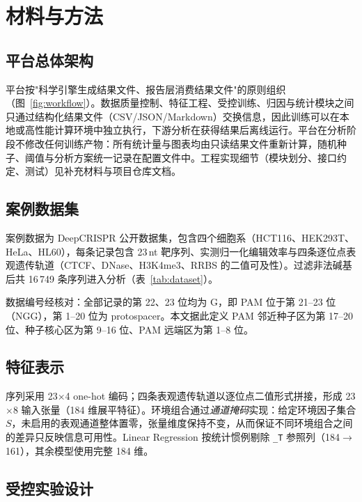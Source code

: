 \section{材料与方法}
\label{sec:methods}

\subsection{平台总体架构}

平台按"科学引擎生成结果文件、报告层消费结果文件"的原则组织（图~\ref{fig:workflow}）。数据质量控制、特征工程、受控训练、归因与统计模块之间只通过结构化结果文件（CSV/JSON/Markdown）交换信息，因此训练可以在本地或高性能计算环境中独立执行，下游分析在获得结果后离线运行。平台在分析阶段不修改任何训练产物：所有统计量与图表均由只读结果文件重新计算，随机种子、阈值与分析方案统一记录在配置文件中。工程实现细节（模块划分、接口约定、测试）见补充材料与项目仓库文档。

\subsection{案例数据集}

案例数据为 DeepCRISPR 公开数据集\citep{Chuai2018GenomeBiol}，包含四个细胞系（HCT116、HEK293T、HeLa、HL60），每条记录包含 23\,nt 靶序列、实测归一化编辑效率与四条逐位点表观遗传轨道（CTCF、DNase、H3K4me3、RRBS 的二值可及性）。过滤非法碱基后共 16\,749 条序列进入分析（表~\ref{tab:dataset}）。

数据编号经核对：全部记录的第 22、23 位均为 G，即 PAM 位于第 21--23 位（NGG），第 1--20 位为 protospacer。本文据此定义 PAM 邻近种子区为第 17--20 位、种子核心区为第 9--16 位、PAM 远端区为第 1--8 位。

\subsection{特征表示}

序列采用 23$\times$4 one-hot 编码；四条表观遗传轨道以逐位点二值形式拼接，形成 23$\times$8 输入张量（184 维展平特征）。环境组合通过\emph{通道掩码}实现：给定环境因子集合 $S$，未启用的表观通道整体置零，张量维度保持不变，从而保证不同环境组合之间的差异只反映信息可用性。Linear Regression 按统计惯例剔除 \texttt{\_T} 参照列（184$\to$161），其余模型使用完整 184 维。

\subsection{受控实验设计}

